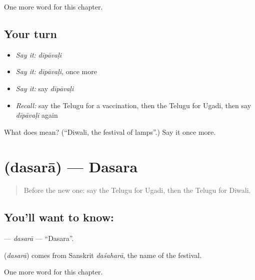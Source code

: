 \begin{grammarlens}[title={What you've built}]
One more word for this chapter.
\end{grammarlens}

\subsection*{Your turn}
\begin{itemize}
\raggedright
  \item \emph{Say it:} \emph{dīpāvaḷi}
  \item \emph{Say it:} \emph{dīpāvaḷi}, once more
  \item \emph{Say it:} say \emph{dīpāvaḷi}
  \item \emph{Recall:} say the Telugu for a vaccination, then the Telugu for Ugadi, then say \emph{dīpāvaḷi} again
\end{itemize}

\begin{tcolorbox}[breakable,colback=teal!4,colframe=teal!35!black,title={Before you move on}]
What does  mean? (\textquotedblleft{}Diwali, the festival of lamps\textquotedblright{}.) Say it once more.
\end{tcolorbox}
\section[\texorpdfstring{\te{దసరా} (dasarā)}{దసరా (dasarā)}]{ (dasarā) — Dasara}

\label{lesson:TE-C252-dasara}



\begin{quote}
Before the new one: say the Telugu for Ugadi, then the Telugu for Diwali.
\end{quote}

\subsection*{You'll want to know: }
\textbf{} — \emph{dasarā} — \textquotedblleft{}Dasara\textquotedblright{}.

\begin{cousinweb}
\textbf{} (\emph{dasarā}) comes from Sanskrit \emph{daśaharā}, the name of the festival.
\end{cousinweb}

\begin{grammarlens}[title={What you've built}]
One more word for this chapter.
\end{grammarlens}

